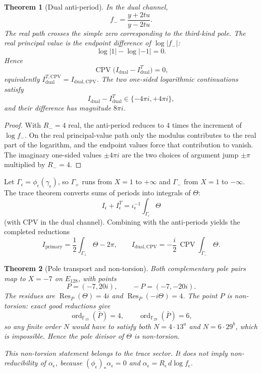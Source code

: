\documentclass[11pt,a4paper]{article}
\newtheorem{theorem}{Theorem}[section]
\theoremstyle{definition}
\theoremstyle{remark}
\newcommand{\ord}{\operatorname{ord}}
\newcommand{\CPV}{\operatorname{CPV}}
\newcommand{\Resop}{\operatorname{Res}}
\begin{document}
\begin{theorem}[Dual anti-period]
\label{thm:dual}
In the dual channel,
\[
f_-
=
\frac{y+2tu}{y-2tu}.
\]
The real path crosses the simple zero corresponding to the third-kind pole.
The real principal value is the endpoint difference of \(\log|f_-|\):
\[
\log|1|-\log|-1|=0.
\]
Hence
\begin{equation}
\boxed{
\CPV\bigl(I_{\mathrm{dual}}-I_{\mathrm{dual}}^T\bigr)=0,
}
\label{eq:Idual}
\end{equation}
equivalently \(I_{\mathrm{dual}}^{T,\mathrm{CPV}}=I_{\mathrm{dual,CPV}}\). The two
one-sided logarithmic continuations satisfy
\[
I_{\mathrm{dual}}-I_{\mathrm{dual}}^T\in\{-4\pi i,+4\pi i\},
\]
and their difference has magnitude \(8\pi i\).
\end{theorem}

\begin{proof}
With \(R_-=4\) real, the anti-period reduces to \(4\) times the increment of
\(\log f_-\). On the real principal-value path only the modulus contributes to
the real part of the logarithm, and the endpoint values force that contribution
to vanish. The imaginary one-sided values \(\pm4\pi i\) are the two choices of
argument jump \(\pm\pi\) multiplied by \(R_-=4\).
\end{proof}

Let \(\Gamma_\epsilon=\phi_\epsilon(\gamma_\epsilon)\), so \(\Gamma_+\) runs from
\(X=1\) to \(+\infty\) and \(\Gamma_-\) from \(X=1\) to \(-\infty\). The trace
theorem converts sums of periods into integrals of \(\Theta\):
\begin{equation}
I_\epsilon+I_\epsilon^T
=
\iota_\epsilon^{-1}\int_{\Gamma_\epsilon}\Theta
\label{eq:Isum}
\end{equation}
(with CPV in the dual channel). Combining with the anti-periods yields the
completed reductions
\begin{equation}
\boxed{
I_{\mathrm{primary}}
=
\frac12\int_{\Gamma_+}\Theta-2\pi,
\qquad
I_{\mathrm{dual,CPV}}
=
-\frac{i}{2}\,\CPV\int_{\Gamma_-}\Theta.
}
\label{eq:completed}
\end{equation}

\begin{theorem}[Pole transport and non-torsion]
\label{thm:nontorsion}
Both complementary pole pairs map to \(X=-7\) on \(E_{128}\), with points
\[
P=(-7,20i),
\qquad
-P=(-7,-20i).
\]
The residues are \(\Resop_P(\Theta)=4i\) and \(\Resop_P(-i\Theta)=4\). The point
\(P\) is non-torsion: exact good reductions give
\[
\ord_{\mathbb F_{13}}(\bar P)=4,
\qquad
\ord_{\mathbb F_{29}}(\bar P)=6,
\]
so any finite order \(N\) would have to satisfy both \(N=4\cdot13^a\) and
\(N=6\cdot29^b\), which is impossible. Hence the pole divisor of \(\Theta\) is
non-torsion.

This non-torsion statement belongs to the trace sector. It does not imply
non-reducibility of \(\alpha_\epsilon\), because
\((\phi_\epsilon)_*\alpha_\epsilon=0\) and
\(\alpha_\epsilon=R_\epsilon\,d\log f_\epsilon\).
\end{theorem}
\end{document}
